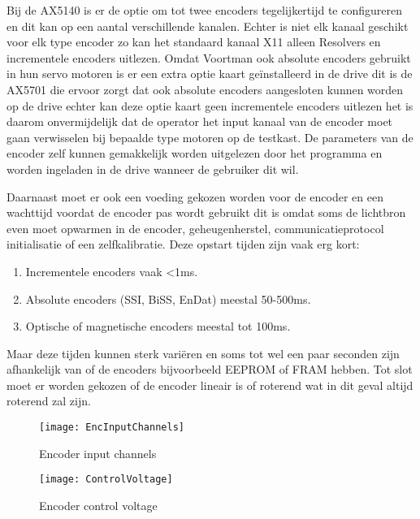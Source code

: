 Bij de \gls{AX5140} is er de optie om tot twee encoders tegelijkertijd te configureren en dit kan op een aantal verschillende kanalen. Echter is niet elk kanaal geschikt voor elk type encoder zo kan het standaard kanaal X11 alleen Resolvers en incrementele encoders uitlezen. Omdat Voortman ook absolute encoders gebruikt in hun servo motoren is er een extra optie kaart geïnstalleerd in de drive dit is de \gls{AX5701} die ervoor zorgt dat ook absolute encoders aangesloten kunnen worden op de drive echter kan deze optie kaart geen incrementele encoders uitlezen het is daarom onvermijdelijk dat de operator het input kanaal van de encoder moet gaan verwisselen bij bepaalde type motoren op de testkast. De parameters van de encoder zelf kunnen gemakkelijk worden uitgelezen door het programma en worden ingeladen in de drive wanneer de gebruiker dit wil.

\vspace{0.5cm}

Daarnaast moet er ook een voeding gekozen worden voor de encoder en een wachttijd voordat de encoder pas wordt gebruikt dit is omdat soms de lichtbron even moet opwarmen in de encoder, geheugenherstel, communicatieprotocol initialisatie of een zelfkalibratie. Deze opstart tijden zijn vaak erg kort:

\begin{enumerate}
	\item Incrementele encoders vaak <1ms.
	\item Absolute encoders (\gls{SSI}, BiSS, EnDat) meestal 50-500ms.
	\item Optische of magnetische encoders meestal tot 100ms.
\end{enumerate}

Maar deze tijden kunnen sterk variëren en soms tot wel een paar seconden zijn afhankelijk van of de encoders bijvoorbeeld \gls{EEPROM} of \gls{FRAM} hebben. Tot slot moet er worden gekozen of de encoder lineair is of roterend wat in dit geval altijd roterend zal zijn.

\begin{figure}[H]
	\centering
	\texttt{[image: EncInputChannels]}
	\label{fig:EncoderInputChannel}
	\caption{Encoder input channels}
\end{figure}

\begin{figure}[H]
	\centering
	\texttt{[image: ControlVoltage]}
	\label{fig:ControlVoltage}
	\caption{Encoder control voltage}
\end{figure}


